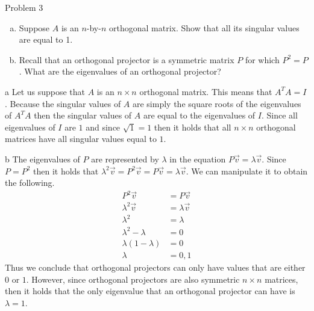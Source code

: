 \begin{section}{Problem 3}
    \begin{problem}{3}
        \begin{enumerate}[(a)]
            \item Suppose $A$ is an $n$-by-$n$ orthogonal matrix. Show that all its singular values are equal to 1.
            \item Recall that an orthogonal projector is a symmetric matrix $P$ for which $P^2=P$. What are the eigenvalues of an orthogonal projector?
        \end{enumerate}
    \end{problem}

    \begin{solution}{a}
        Let us suppose that $A$ is an $n \times n$ orthogonal matrix. This means that $A^T A = I$. Because the singular values of $A$ are simply the square roots of the eigenvalues of $A^T A$ then the singular values of $A$ are equal to the eigenvalues of $I$. Since all eigenvalues of $I$ are $1$ and since $\sqrt{1} = 1$ then it holds that all $n \times n$ orthogonal matrices have all singular values equal to $1$.
    \end{solution}

    \newpage
    
    \begin{solution}{b}
        The eigenvalues of $P$ are represented by $\lambda$ in the equation $P \vec{v} = \lambda \vec{v}$. Since $P = P^2$ then it holds that $\lambda^2 \vec{v} = P^2 \vec{v} = P \vec{v} = \lambda \vec{v}$. We can manipulate it to obtain the following.
        \begin{align*}
            P^2 \vec{v} &= P \vec{v} \\
            \lambda^2 \vec{v} &= \lambda \vec{v} \\
            \lambda^2 &= \lambda \\
            \lambda^2 - \lambda &= 0 \\
            \lambda (1 - \lambda) &= 0 \\
            \lambda &= 0, 1
        \end{align*}
        Thus we conclude that orthogonal projectors can only have values that are either $0$ or $1$. However, since orthogonal projectors are also symmetric $n \times n$ matrices, then it holds that the only eigenvalue that an orthogonal projector can have is $\lambda = 1$.
    \end{solution}
\end{section}